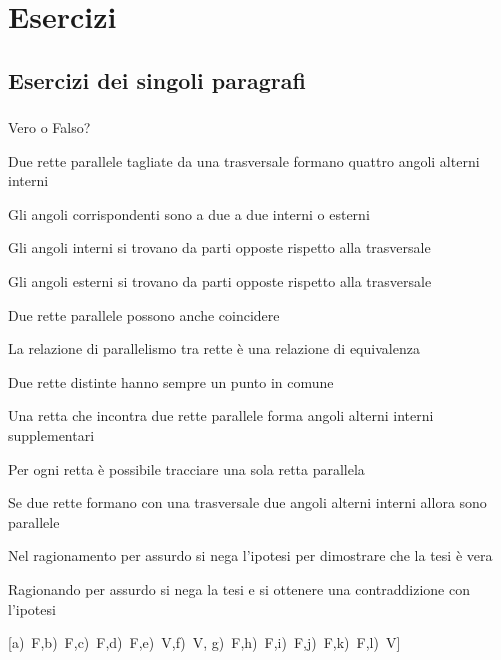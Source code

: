 
\section{Esercizi}

\subsection{Esercizi dei singoli paragrafi}


\subsubsection*{}

\begin{esercizio}
\label{ese:3.15}
Vero o Falso?
\begin{enumeratea}
\item Due rette parallele tagliate da una trasversale formano quattro 
angoli alterni interni\tab\hfill\boxV\quad\boxF
\item Gli angoli corrispondenti sono a due a due interni o 
esterni\hfill\boxV\quad\boxF
\item Gli angoli interni si trovano da parti opposte rispetto alla 
trasversale\hfill\boxV\quad\boxF
\item Gli angoli esterni si trovano da parti opposte rispetto alla 
trasversale\hfill\boxV\quad\boxF
\item Due rette parallele possono anche 
coincidere\hfill\boxV\quad\boxF
\item La relazione di parallelismo tra rette è una relazione di 
equivalenza\hfill\boxV\quad\boxF
\item Due rette distinte hanno sempre un punto in 
comune\hfill\boxV\quad\boxF
\item Una retta che incontra due rette parallele forma angoli alterni 
interni supplementari\tab\hfill\boxV\quad\boxF
\item Per ogni retta è possibile tracciare una sola retta 
parallela\hfill\boxV\quad\boxF
\item Se due rette formano con una trasversale due angoli alterni 
interni allora sono parallele\tab\hfill\boxV\quad\boxF
\item Nel ragionamento per assurdo si nega l'ipotesi per dimostrare 
che la tesi è vera\tab\tab\hfill\boxV\quad\boxF
\item Ragionando per assurdo si nega la tesi e si ottenere una 
contraddizione con l'ipotesi\tab\hfill\boxV\quad\boxF
\end{enumeratea}
\hfill [a)~F,\quad b)~F,\quad c)~F,\quad d)~F,\quad e)~V,\quad f)~V,\quad 
g)~F,\quad h)~F,\quad i)~F,\quad j)~F,\quad k)~F,\quad l)~V]
\end{esercizio}

